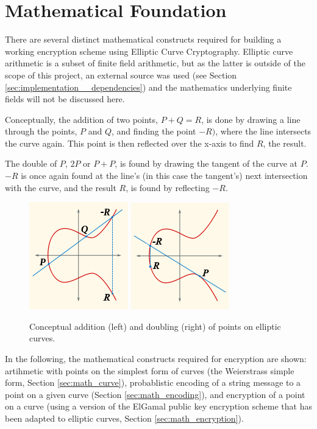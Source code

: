 \section{Mathematical Foundation}

There are several distinct mathematical constructs required for building a working encryption scheme using Elliptic
Curve Cryptography. Elliptic curve arithmetic is a subset of finite field arithmetic, but as the latter is outside
of the scope of this project, an external source was used (see Section \ref{sec:implementation__dependencies}) and
the mathematics underlying finite fields will not be discussed here.

Conceptually, the addition of two points, \(P + Q = R\), is done by drawing a line through the points, \(P\) and \(Q\),
and finding the point \(-R)\), where the line intersects the curve again. This point is
then reflected over the x-axis to find \(R\), the result.

The double of \(P\), \(2P\) or \(P+P\), is found by drawing the tangent of the curve at \(P\).
\(-R\) is once again found at the line's (in this case the tangent's) next intersection
with the curve, and the result \(R\), is found by reflecting \(-R\).\cite{hankerson2010}

\begin{figure}[htb]
	\centering
	\includegraphics{maths/addition}
	\includegraphics{maths/doubling}
	\caption{Conceptual addition (left) and doubling (right) of points on elliptic curves.}
\end{figure}

In the following, the mathematical constructs required for encryption are shown: artihmetic with points on the simplest
form of curves (the Weierstrass simple form, Section \ref{sec:math_curve}), probablistic encoding of a string message
to a point on a given curve (Section \ref{sec:math_encoding}), and encryption of a point on a curve (using a version
of the ElGamal public key encryption scheme that has been adapted to elliptic curves, Section \ref{sec:math_encryption}).



